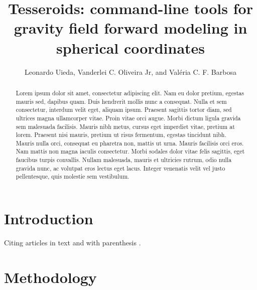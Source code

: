 \documentclass[paper,twocolumn,twoside]{geophysics}
\begin{document}
\title{
    Tesseroids:
    command-line tools for
    gravity field forward modeling
    in spherical coordinates
}

\ms{}

\address{
    \footnotemark[1]
    Universidade do Estado do Rio de Janeiro, Rio de Janeiro, Brazil,
    e-mail: \\
    \footnotemark[2]
    Observat\'orio Nacional, Rio de Janeiro, Brazil,
    e-mail:
}

\author{Leonardo Uieda\footnotemark[1]\footnotemark[2],
        Vanderlei C. Oliveira Jr\footnotemark[2],
        and
        Val\'eria C. F. Barbosa\footnotemark[2]}



\begin{abstract}
Lorem ipsum dolor sit amet, consectetur adipiscing elit. Nam eu dolor pretium,
egestas mauris sed, dapibus quam. Duis hendrerit mollis nunc a consequat. Nulla
et sem consectetur, interdum velit eget, aliquam ipsum. Praesent sagittis
tortor diam, sed ultrices magna ullamcorper vitae. Proin vitae orci augue.
Morbi dictum ligula gravida sem malesuada facilisis. Mauris nibh metus, cursus
eget imperdiet vitae, pretium at lorem. Praesent nisi mauris, pretium ut risus
fermentum, egestas tincidunt nibh. Mauris nulla orci, consequat eu pharetra
non, mattis ut urna. Mauris facilisis orci eros. Nam mattis non magna iaculis
consectetur. Morbi sodales dolor vitae felis sagittis, eget faucibus turpis
convallis. Nullam malesuada, mauris et ultricies rutrum, odio nulla gravida
nunc, ac volutpat eros lectus eget lacus. Integer venenatis velit vel justo
pellentesque, quis molestie sem vestibulum.
\end{abstract}

\section{Introduction}

Citing articles in text \citet{Asgharzadeh2007} and with parenthesis
\citep{Braitenberg2011}.


\section{Methodology}
\end{document}
